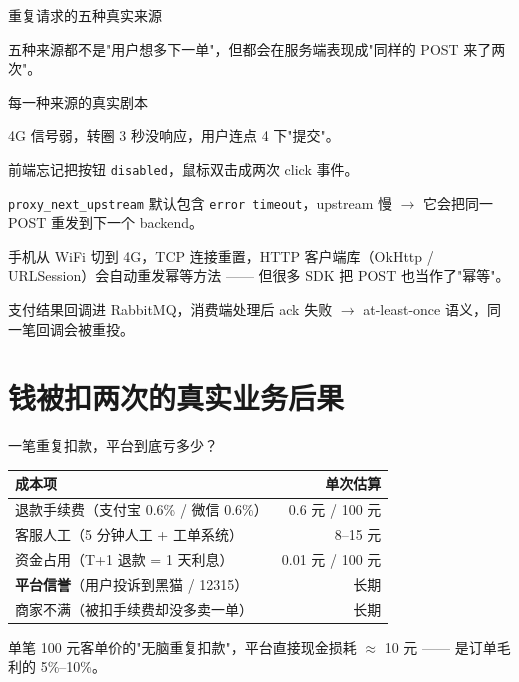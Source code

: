 \begin{frame}{重复请求的五种真实来源}
\vspace{2mm}
\small 五种来源都不是"用户想多下一单"，但都会在服务端表现成"同样的 POST 来了两次"。
\end{frame}

\begin{frame}{每一种来源的真实剧本}
\begin{description}\small
  \item[弱网狂点] 4G 信号弱，转圈 3 秒没响应，用户连点 4 下"提交"。
  \item[按钮未禁] 前端忘记把按钮 \texttt{disabled}，鼠标双击成两次 click 事件。
  \item[Nginx 重试] \texttt{proxy\_next\_upstream} 默认包含 \texttt{error timeout}，upstream 慢 $\to$ 它会把同一 POST 重发到下一个 backend。
  \item[网络切换] 手机从 WiFi 切到 4G，TCP 连接重置，HTTP 客户端库（OkHttp / URLSession）会自动重发幂等方法 —— 但很多 SDK 把 POST 也当作了"幂等"。
  \item[MQ 重投] 支付结果回调进 RabbitMQ，消费端处理后 ack 失败 $\to$ at-least-once 语义，同一笔回调会被重投。
\end{description}
\end{frame}

\section{钱被扣两次的真实业务后果}

\begin{frame}{一笔重复扣款，平台到底亏多少？}
\begin{tabular}{@{}lr@{}}
\toprule
成本项 & 单次估算 \\
\midrule
退款手续费（支付宝 0.6\% / 微信 0.6\%） & 0.6 元 / 100 元 \\
客服人工（5 分钟人工 + 工单系统） & 8--15 元 \\
资金占用（T+1 退款 = 1 天利息） & 0.01 元 / 100 元 \\
\textbf{平台信誉}（用户投诉到黑猫 / 12315） & 长期 \\
商家不满（被扣手续费却没多卖一单）& 长期 \\
\bottomrule
\end{tabular}
\vspace{2mm}
\small 单笔 100 元客单价的"无脑重复扣款"，平台直接现金损耗 $\approx$ 10 元 —— 是订单毛利的 5\%--10\%。
\end{frame}

